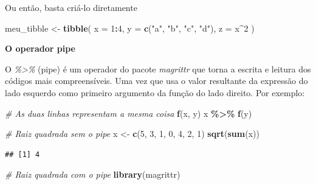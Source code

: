 \documentclass[
]{book}
\newenvironment{Shaded}{\begin{snugshade}}{\end{snugshade}}
\newcommand{\AttributeTok}[1]{\textcolor[rgb]{0.13,0.29,0.53}{#1}}
\newcommand{\CommentTok}[1]{\textcolor[rgb]{0.56,0.35,0.01}{\textit{#1}}}
\newcommand{\DecValTok}[1]{\textcolor[rgb]{0.00,0.00,0.81}{#1}}
\newcommand{\FunctionTok}[1]{\textcolor[rgb]{0.13,0.29,0.53}{\textbf{#1}}}
\newcommand{\NormalTok}[1]{#1}
\newcommand{\OtherTok}[1]{\textcolor[rgb]{0.56,0.35,0.01}{#1}}
\newcommand{\SpecialCharTok}[1]{\textcolor[rgb]{0.81,0.36,0.00}{\textbf{#1}}}
\newcommand{\StringTok}[1]{\textcolor[rgb]{0.31,0.60,0.02}{#1}}
\begin{document}
Ou então, basta criá-lo diretamente

\begin{Shaded}
\begin{Highlighting}[]
\NormalTok{meu\_tibble }\OtherTok{\textless{}{-}} \FunctionTok{tibble}\NormalTok{(}
  \AttributeTok{x =} \DecValTok{1}\SpecialCharTok{:}\DecValTok{4}\NormalTok{,}
  \AttributeTok{y =} \FunctionTok{c}\NormalTok{(}\StringTok{"a"}\NormalTok{, }\StringTok{"b"}\NormalTok{, }\StringTok{"c"}\NormalTok{, }\StringTok{"d"}\NormalTok{),}
  \AttributeTok{z =}\NormalTok{ x}\SpecialCharTok{\^{}}\DecValTok{2}
\NormalTok{)}
\end{Highlighting}
\end{Shaded}

\textbf{O operador pipe}

O \emph{\%\textgreater\%} (pipe) é um operador do pacote \emph{magrittr} que torna a escrita e leitura dos códigos mais compreensíveis. Uma vez que usa o valor resultante da expressão do lado esquerdo como primeiro argumento da função do lado direito. Por exemplo:

\begin{Shaded}
\begin{Highlighting}[]
\CommentTok{\# As duas linhas representam a mesma coisa}
\FunctionTok{f}\NormalTok{(x, y)}
\NormalTok{x }\SpecialCharTok{\%\textgreater{}\%} \FunctionTok{f}\NormalTok{(y)}
\end{Highlighting}
\end{Shaded}

\begin{Shaded}
\begin{Highlighting}[]
\CommentTok{\# Raiz quadrada sem o pipe}
\NormalTok{x }\OtherTok{\textless{}{-}} \FunctionTok{c}\NormalTok{(}\DecValTok{5}\NormalTok{, }\DecValTok{3}\NormalTok{, }\DecValTok{1}\NormalTok{, }\DecValTok{0}\NormalTok{, }\DecValTok{4}\NormalTok{, }\DecValTok{2}\NormalTok{, }\DecValTok{1}\NormalTok{)}
\FunctionTok{sqrt}\NormalTok{(}\FunctionTok{sum}\NormalTok{(x))}
\end{Highlighting}
\end{Shaded}

\begin{verbatim}
## [1] 4
\end{verbatim}

\begin{Shaded}
\begin{Highlighting}[]
\CommentTok{\# Raiz quadrada com o pipe}
\FunctionTok{library}\NormalTok{(magrittr)}
\end{Highlighting}
\end{Shaded}
\end{document}

